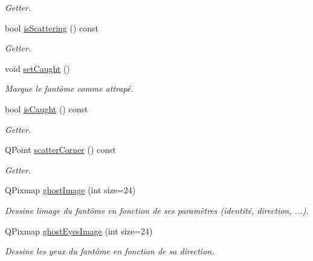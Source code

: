 \begin{DoxyCompactItemize}
\begin{DoxyCompactList}\small\item\em Getter. \end{DoxyCompactList}\item 
bool \hyperlink{class_ghost_aee8ff34fc61b92cc86274fa2b967e814}{is\+Scattering} () const 
\begin{DoxyCompactList}\small\item\em Getter. \end{DoxyCompactList}\item 
\hypertarget{class_ghost_af5702aa6b5aec6edfa9f00843eacd3bb}{}void \hyperlink{class_ghost_af5702aa6b5aec6edfa9f00843eacd3bb}{set\+Caught} ()\label{class_ghost_af5702aa6b5aec6edfa9f00843eacd3bb}

\begin{DoxyCompactList}\small\item\em Marque le fantôme comme attrapé. \end{DoxyCompactList}\item 
bool \hyperlink{class_ghost_adb8eaa0f4a713181fd91f758b7862394}{is\+Caught} () const 
\begin{DoxyCompactList}\small\item\em Getter. \end{DoxyCompactList}\item 
Q\+Point \hyperlink{class_ghost_af538955b257089ee1ab73bcc061b503e}{scatter\+Corner} () const 
\begin{DoxyCompactList}\small\item\em Getter. \end{DoxyCompactList}\item 
Q\+Pixmap \hyperlink{class_ghost_a829efb522dca9924e8228573a08e11c8}{ghost\+Image} (int size=24)
\begin{DoxyCompactList}\small\item\em Dessine l\textquotesingle{}image du fantôme en fonction de ses paramètres (identité, direction, ...). \end{DoxyCompactList}\item 
Q\+Pixmap \hyperlink{class_ghost_a756b09568125dbb619ff93d97ffc9eff}{ghost\+Eyes\+Image} (int size=24)
\begin{DoxyCompactList}\small\item\em Dessine les yeux du fantôme en fonction de sa direction. \end{DoxyCompactList}\end{DoxyCompactItemize}
